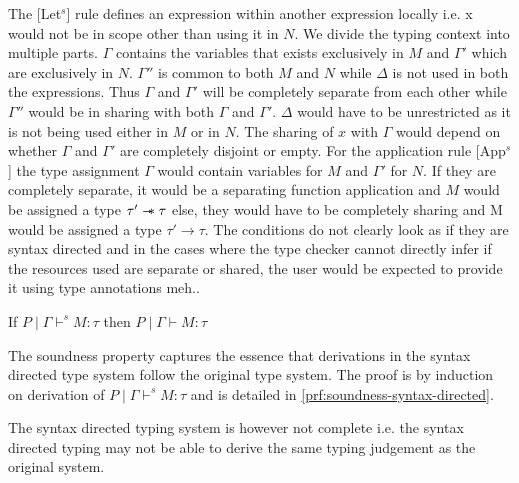 The [Let$^s$] rule defines an expression within another expression locally i.e. x would
not be in scope other than using it in $N$. We divide the typing context into multiple parts.
$\Gamma$ contains the variables that exists exclusively in $M$ and $\Gamma'$ which
are exclusively in $N$. $\Gamma''$ is common to both $M$ and $N$ while $\Delta$ is not used in both the expressions.
Thus $\Gamma$ and $\Gamma'$ will be completely separate from each other while $\Gamma''$ would be in sharing with both $\Gamma$ and $\Gamma'$.
$\Delta$ would have to be unrestricted as it is not being used either in $M$ or in $N$. The sharing of $x$ with $\Gamma$ would depend on
whether $\Gamma$ and $\Gamma'$ are completely disjoint or empty. For the application rule [App$^s$] the type assignment $\Gamma$ would contain
variables for $M$ and $\Gamma'$ for $N$. If they are completely separate, it would be a separating function application and $M$ would be
assigned a type $\tau' \mathrel{-\mkern-6mu*} \tau$ else, they would have to be completely sharing and M would be assigned a type $\tau' \rightarrow \tau$.
The conditions do not clearly look as if they are syntax directed and in the cases where the type checker cannot directly infer if the
resources used are separate or shared, the user would be expected to provide it using type annotations  {\color{red} meh.}.

\begin{theorem}
  If $P \mid \Gamma \vdash^s M:\tau$ then $P \mid \Gamma \vdash M : \tau$
\end{theorem}
The soundness property captures the essence that derivations in the syntax directed type system follow the original type system.
The proof is by induction on derivation of $P \mid \Gamma \vdash^s M:\tau$ and is detailed in \cref{prf:soundness-syntax-directed}.

The syntax directed typing system is however not complete i.e. the syntax directed typing may not be able to derive the same
typing judgement as the original system. 

